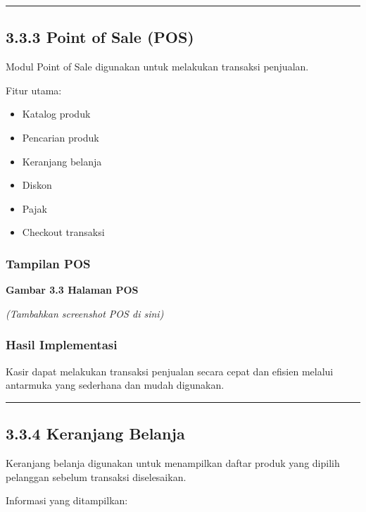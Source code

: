 \begin{center}\rule{0.5\linewidth}{0.5pt}\end{center}

\subsection{3.3.3 Point of Sale (POS)}\label{point-of-sale-pos-1}

Modul Point of Sale digunakan untuk melakukan transaksi penjualan.

Fitur utama:

\begin{itemize}
\tightlist
\item
  Katalog produk
\item
  Pencarian produk
\item
  Keranjang belanja
\item
  Diskon
\item
  Pajak
\item
  Checkout transaksi
\end{itemize}

\subsubsection{Tampilan POS}\label{tampilan-pos}

\textbf{Gambar 3.3 Halaman POS}

\emph{(Tambahkan screenshot POS di sini)}

\subsubsection{Hasil Implementasi}\label{hasil-implementasi-2}

Kasir dapat melakukan transaksi penjualan secara cepat dan efisien melalui antarmuka yang sederhana dan mudah digunakan.

\begin{center}\rule{0.5\linewidth}{0.5pt}\end{center}

\subsection{3.3.4 Keranjang Belanja}\label{keranjang-belanja}

Keranjang belanja digunakan untuk menampilkan daftar produk yang dipilih pelanggan sebelum transaksi diselesaikan.

Informasi yang ditampilkan:

